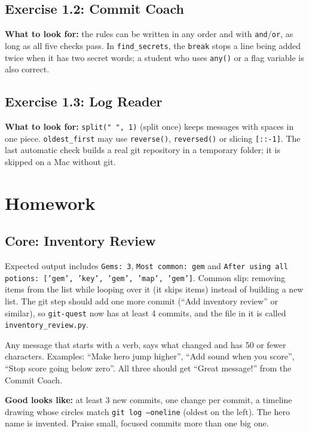 \subsection{Exercise 1.2: Commit Coach}
\begin{answer}
\textbf{What to look for:} the rules can be written in any order and with \texttt{and}/\texttt{or}, as long as all five checks pass.
In \texttt{find\_secrets}, the \texttt{break} stops a line being added twice when it has two secret words; a student who uses
\texttt{any()} or a flag variable is also correct.
\end{answer}

\subsection{Exercise 1.3: Log Reader}
\begin{answer}
\textbf{What to look for:} \texttt{split(" ", 1)} (split once) keeps messages with spaces in one piece. \texttt{oldest\_first} may use
\texttt{reverse()}, \texttt{reversed()} or slicing \texttt{[::-1]}. The last automatic check builds a real git repository in a temporary
folder; it is skipped on a Mac without git.
\end{answer}

\section{Homework}
\subsection{Core: Inventory Review}
\begin{answer}
Expected output includes \texttt{Gems: 3}, \texttt{Most common: gem} and \texttt{After using all potions: ['gem', 'key', 'gem', 'map', 'gem']}.
Common slip: removing items from the list while looping over it (it skips items) instead of building a new list.
The git step should add one more commit (\enquote{Add inventory review} or similar), so \texttt{git-quest} now has at least 4 commits, and the file in it is called \texttt{inventory\_review.py}.
\end{answer}

\begin{answer}
Any message that starts with a verb, says what changed and has 50 or fewer characters. Examples:
\enquote{Make hero jump higher}, \enquote{Add sound when you score}, \enquote{Stop score going below zero}.
All three should get \enquote{Great message!} from the Commit Coach.
\end{answer}

\begin{answer}
\textbf{Good looks like:} at least 3 new commits, one change per commit, a timeline drawing whose circles match \texttt{git log --oneline}
(oldest on the left). The hero name is invented. Praise small, focused commits more than one big one.
\end{answer}
